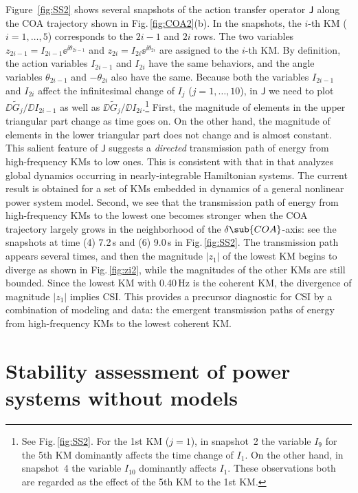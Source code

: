\documentclass[a4paper,10pt]{article}
\begin{document}
%
Figure~\ref{fig:SS2} shows several snapshots of the action transfer operator ${\sf J}$ along the COA trajectory shown in Fig.\,\ref{fig:COA2}(b).  
In the snapshots, the $i$-th KM ($i=1,\ldots,5$) corresponds to the $2i-1$ and $2i$ rows.  
The two variables $z_{2i-1}=I_{2i-1}\ee^{\ii\theta_{2i-1}}$ and $z_{2i}=I_{2i}\ee^{\ii\theta_{2i}}$ are assigned to the $i$-th KM.  
By definition, the action variables $I_{2i-1}$ and $I_{2i}$ have the same behaviors, and the angle variables $\theta_{2i-1}$ and $-\theta_{2i}$ also have the same.  
Because both the variables $I_{2i-1}$ and $I_{2i}$ affect the infinitesimal change of $I_j$ ($j=1,\ldots,10$),  in $\mathsf{J}$ we need to plot $\DD \tilde{G}_{j}/\DD I_{2i-1}$ as well as $\DD \tilde{G}_{j}/\DD I_{2i}$.\footnote{See Fig.\,\ref{fig:SS2}.  For the 1st KM ($j=1$), in snapshot~2 the variable $I_{9}$ for the 5th KM dominantly affects the time change of $I_{1}$.  On the other hand, in snapshot~4 the variable $I_{10}$ dominantly affects $I_{1}$.  
These observations both are regarded as the effect of the 5th KM to the 1st KM.  }
First, the magnitude of elements in the upper triangular part change as time goes on.  
On the other hand, the magnitude of elements in the lower triangular part does not change and is almost constant.  
This salient feature of $\mathsf{J}$ suggests a \emph{directed} transmission path of energy from high-frequency KMs to low ones.   
This is consistent with that in \cite{Eisenhower_CDC07} that analyzes global dynamics occurring in nearly-integrable Hamiltonian systems.  
The current result is obtained for a set of KMs embedded in dynamics of a general nonlinear power system model.  
Second, we see that the transmission path of energy from high-frequency KMs to the lowest one becomes stronger when the COA trajectory largely grows in the neighborhood of the $\delta\sub{COA}$-axis: see the snapshots at time (4) 7.2\,s and (6) 9.0\,s in Fig.\,\ref{fig:SS2}.  
The transmission path appears several times, and then the magnitude $|z_1|$ of the lowest KM begins to diverge as shown in Fig.\,\ref{fig:zi2}, while the magnitudes of the other KMs are still bounded.  
Since the lowest KM with 0.40\,Hz is the coherent KM, the divergence  of magnitude $|z_1|$ implies CSI.  
This provides a precursor diagnostic for CSI by a combination of modeling and data: the emergent transmission paths of energy from high-frequency KMs to the lowest coherent KM.  


\section{Stability assessment of power systems without models}
\label{sec:stability}
\end{document}
